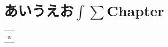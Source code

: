 \documentclass{ltjbook}
\begin{document}
\chapter{あいうえお$\int\displaystyle\sum$Chapter}
\begin{tabular}{c}
  \makeatletter
  a\global\let\AAA=\@preamble
\end{tabular}
\tracingnone
\typeout{\meaning\AAA}
\end{document}
